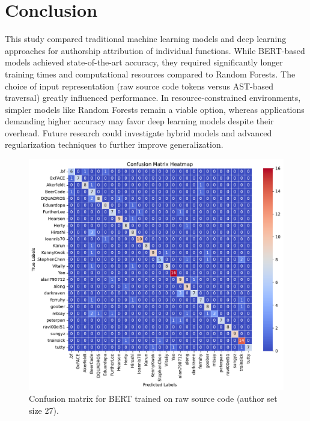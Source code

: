 \documentclass[conference]{IEEEtran}
\begin{document}
\section{Conclusion}

This study compared traditional machine learning models and deep learning approaches for authorship attribution of individual functions. While BERT-based models achieved state-of-the-art accuracy, they required significantly longer training times and computational resources compared to Random Forests. The choice of input representation (raw source code tokens versus AST-based traversal) greatly influenced performance. In resource-constrained environments, simpler models like Random Forests remain a viable option, whereas applications demanding higher accuracy may favor deep learning models despite their overhead. Future research could investigate hybrid models and advanced regularization techniques to further improve generalization.

\begin{figure}[!b]
    \centering
    \includegraphics[width=\columnwidth]{figures/conf_matrix_sourcode_bert_ts27.pdf}
    \caption{Confusion matrix for BERT trained on raw source code (author set size 27).}
    \label{fig:conf_matrix_bert}
\end{figure}
\end{document}
